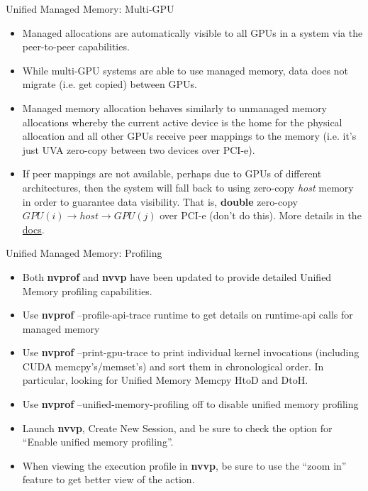 \documentclass{beamer}
\begin{document}
\begin{frame}{Unified Managed Memory: Multi-GPU}
\begin{itemize}
    \item<1->Managed allocations are automatically visible to all GPUs in a system via the peer-to-peer capabilities.
    \item<1->While multi-GPU systems are able to use managed memory, data does not migrate (i.e. get copied) between GPUs.
    \item<1->Managed memory allocation behaves similarly to unmanaged memory allocations whereby the current active device is the home for the physical allocation and all other GPUs receive peer mappings to the memory (i.e. it's just UVA zero-copy between two devices over PCI-e).
    \item<1->If peer mappings are not available, perhaps due to GPUs of different architectures, then the system will fall back to using zero-copy \emph{host} memory in order to guarantee data visibility.  That is, \textbf{double} zero-copy $GPU(i) \rightarrow host \rightarrow GPU(j)$ over PCI-e (don't do this).  More details in the \href{http://docs.nvidia.com/cuda/cuda-c-programming-guide/index.html\#um-managed-memory}{\color{blue}docs}.
\end{itemize}
\end{frame}

\begin{frame}{Unified Managed Memory: Profiling}
\begin{itemize}
    \item<1->Both {\selectfont \textbf{nvprof}} and {\selectfont \textbf{nvvp}} have been updated to provide detailed Unified Memory profiling capabilities.
    \item<1->Use {\selectfont \textbf{nvprof} --profile-api-trace runtime} to get details on runtime-api calls for managed memory
    \item<1->Use {\selectfont \textbf{nvprof} --print-gpu-trace} to print individual kernel invocations (including CUDA memcpy's/memset's)
                        and sort them in chronological order.  In particular, looking for Unified Memory Memcpy HtoD and DtoH.
    \item<1->Use {\selectfont \textbf{nvprof} --unified-memory-profiling off} to disable unified memory profiling 
    \item<1->Launch {\selectfont \textbf{nvvp}}, Create New Session, and be sure to check the option for ``Enable unified memory profiling''.
    \item<1->When viewing the execution profile in {\selectfont \textbf{nvvp}}, be sure to use the ``zoom in'' feature to get better view of the action.

\end{itemize}
\end{frame}
\end{document}
